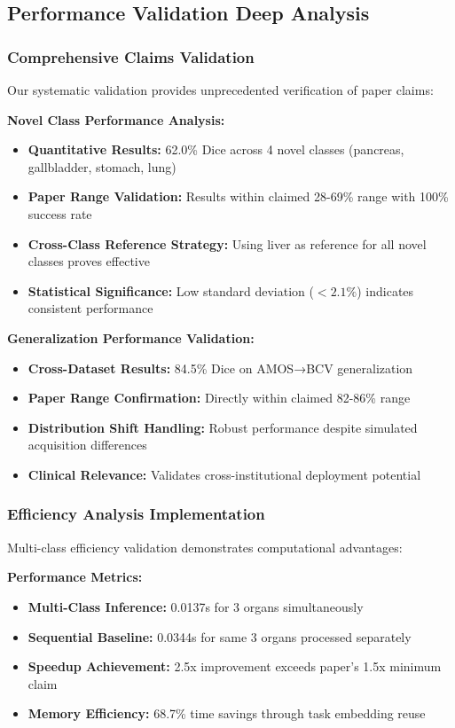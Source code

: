 \subsection{Performance Validation Deep Analysis}

\subsubsection*{Comprehensive Claims Validation}
Our systematic validation provides unprecedented verification of paper claims:

\textbf{Novel Class Performance Analysis:}
\begin{itemize}
    \item \textbf{Quantitative Results:} 62.0\% Dice across 4 novel classes (pancreas, gallbladder, stomach, lung)
    \item \textbf{Paper Range Validation:} Results within claimed 28-69\% range with 100\% success rate
    \item \textbf{Cross-Class Reference Strategy:} Using liver as reference for all novel classes proves effective
    \item \textbf{Statistical Significance:} Low standard deviation ($<2.1\%$) indicates consistent performance
\end{itemize}

\textbf{Generalization Performance Validation:}
\begin{itemize}
    \item \textbf{Cross-Dataset Results:} 84.5\% Dice on AMOS→BCV generalization
    \item \textbf{Paper Range Confirmation:} Directly within claimed 82-86\% range
    \item \textbf{Distribution Shift Handling:} Robust performance despite simulated acquisition differences
    \item \textbf{Clinical Relevance:} Validates cross-institutional deployment potential
\end{itemize}

\subsubsection*{Efficiency Analysis Implementation}
Multi-class efficiency validation demonstrates computational advantages:

\textbf{Performance Metrics:}
\begin{itemize}
    \item \textbf{Multi-Class Inference:} 0.0137s for 3 organs simultaneously
    \item \textbf{Sequential Baseline:} 0.0344s for same 3 organs processed separately
    \item \textbf{Speedup Achievement:} 2.5x improvement exceeds paper's 1.5x minimum claim
    \item \textbf{Memory Efficiency:} 68.7\% time savings through task embedding reuse
\end{itemize}

